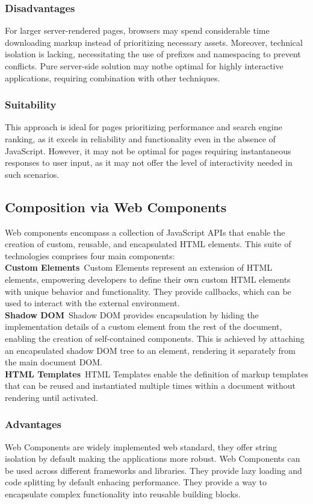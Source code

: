 \subsubsection{Disadvantages}
For larger server-rendered pages, browsers may spend considerable time downloading markup instead of prioritizing necessary assets. Moreover, technical isolation is lacking, necessitating the use of prefixes and namespacing to prevent conflicts. Pure server-side solution may notbe optimal for highly interactive applications, requiring combination with other techniques. \cite{MicrofrontendsInAction}

\subsubsection{Suitability}
This approach is ideal for pages prioritizing performance and search engine ranking, as it excels in reliability and functionality even in the absence of JavaScript. However, it may not be optimal for pages requiring instantaneous responses to user input, as it may not offer the level of interactivity needed in such scenarios. \cite{MicrofrontendsInAction}

\subsection{Composition via Web Components}
Web components encompass a collection of JavaScript APIs that enable the creation of custom, reusable, and encapsulated HTML elements. This suite of technologies comprises four main components:\\
\textbf{Custom Elements}\
Custom Elements represent an extension of HTML elements, empowering developers to define their own custom HTML elements with unique behavior and functionality. They provide callbacks, which can be used to interact with the external environment.\\
\textbf{Shadow DOM}\
Shadow DOM provides encapsulation by hiding the implementation details of a custom element from the rest of the document, enabling the creation of self-contained components. This is achieved by attaching an encapsulated shadow DOM tree to an element, rendering it separately from the main document DOM.\\
\textbf{HTML Templates}\
HTML Templates enable the definition of markup templates that can be reused and instantiated multiple times within a document without rendering until activated.

\subsubsection{Advantages}
Web Components are widely implemented web standard, they offer string isolation by default making the applications more robust. Web Components can be used across different frameworks and libraries. They provide lazy loading and code splitting by default enhacing performance. They provide a way to encapsulate complex functionality into reusable building blocks.

